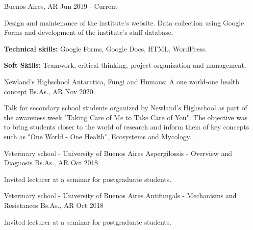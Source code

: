 \begin{cventries}
    {Buenos Aires, AR} %
    {Jun 2019 - Current} %
    {
      \begin{cvitems} %
        \item {Design and maintenance of the institute's website. Data collection using Google Forms and development of the institute's staff database.}
        \item {\textbf{Technical skills:} Google Forms, Google Docs, HTML, WordPress.}
        \item {\textbf{Soft Skills:} Teamwork, critical thinking, project organization and management.}
      \end{cvitems}
    }
\end{cventries}

\vspace{15mm}
\begin{cventries}
  \cventry
    {Newland's Highschool} %
    {Antarctica, Fungi and Humans: A one world-one health concept} %
    {Bs.As., AR} %
    {Nov 2020} %
    {
      \begin{cvitems} %
        \item {Talk for secondary school students organized by Newland's Highschool as part of the awareness week "Taking Care of Me to Take Care of You". The objective was to bring students closer to the world of research and inform them of key concepts such as "One World - One Health", Ecosystems and Mycology.
. }
      \end{cvitems}
    }
  \cventry
    {Veterinary school - University of Buenos Aires} %
    {Aspergilossis - Overview and Diagnosis} %
    {Bs.As., AR} %
    {Oct 2018} %
    {
      \begin{cvitems} %
        \item {Invited lecturer at a seminar for postgraduate students.}
      \end{cvitems}
    }
  \cventry
    {Veterinary school - University of Buenos Aires} %
    {Antifungals - Mechanisms and Resistances} %
    {Bs.As., AR} %
    {Oct 2018} %
    {
      \begin{cvitems} %
        \item {Invited lecturer at a seminar for postgraduate students.}
      \end{cvitems}
    }

\end{cventries}
